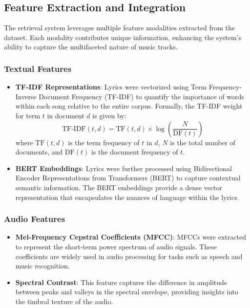 \documentclass[sigconf]{acmart}
\begin{document}
\subsection{Feature Extraction and Integration}
\label{subsec:feature_extraction_integration}

The retrieval system leverages multiple feature modalities extracted from the dataset. Each modality contributes unique information, enhancing the system's ability to capture the multifaceted nature of music tracks.

\subsubsection{Textual Features}

\begin{itemize}
    \item \textbf{TF-IDF Representations}: Lyrics were vectorized using Term Frequency-Inverse Document Frequency (TF-IDF) to quantify the importance of words within each song relative to the entire corpus. Formally, the TF-IDF weight for term \( t \) in document \( d \) is given by:
    \[
    \text{TF-IDF}(t, d) = \text{TF}(t, d) \times \log\left(\frac{N}{\text{DF}(t)}\right)
    \]
    where \( \text{TF}(t, d) \) is the term frequency of \( t \) in \( d \), \( N \) is the total number of documents, and \( \text{DF}(t) \) is the document frequency of \( t \).

    \item \textbf{BERT Embeddings}: Lyrics were further processed using Bidirectional Encoder Representations from Transformers (BERT) to capture contextual semantic information. The BERT embeddings provide a dense vector representation that encapsulates the nuances of language within the lyrics.
\end{itemize}

\subsubsection{Audio Features}

\begin{itemize}
    \item \textbf{Mel-Frequency Cepstral Coefficients (MFCC)}: MFCCs were extracted to represent the short-term power spectrum of audio signals. These coefficients are widely used in audio processing for tasks such as speech and music recognition.
    
    \item \textbf{Spectral Contrast}: This feature captures the difference in amplitude between peaks and valleys in the spectral envelope, providing insights into the timbral texture of the audio.
\end{itemize}
\end{document}
